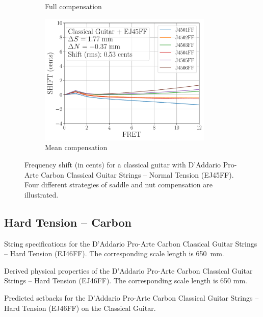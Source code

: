 \begin{figure}
\begin{subfigure}[b]{0.46\textwidth}
    \caption{Full compensation}
    \label{fig:shift_classicalguitar_ej45ff_full}
   \end{subfigure}
   \hspace{0.25in}
   \begin{subfigure}[b]{0.46\textwidth}
    \centering
    \includegraphics[width=3.25in]{../figures/shift_classicalguitar_ej45ff_mean}
    \caption{Mean compensation}
    \label{fig:shift_classicalguitar_ej45ff_mean}
   \end{subfigure}
   \caption{\label{fig:compensation_classicalguitar_ej45ff} Frequency shift (in cents) for a classical guitar with D'Addario Pro-Arte Carbon Classical Guitar Strings -- Normal Tension (EJ45FF). Four different strategies of saddle and nut compensation are illustrated.}
 \end{figure}
 
 \newpage
 \subsection{Hard Tension -- Carbon}
 
 \begin{table}[htbp]
   \centering
   \caption{\label{tbl:ej46ff_mks} String specifications for the D'Addario Pro-Arte Carbon Classical Guitar Strings -- Hard Tension (EJ46FF). The corresponding scale length is 650~mm.}
   
 \end{table}%
 
 \begin{table}[htbp]
   \centering
   \caption{\label{tbl:ej46ff_props} Derived physical properties of the D'Addario Pro-Arte Carbon Classical Guitar Strings -- Hard Tension (EJ46FF). The corresponding scale length is 650 mm.}
   
 \end{table}%
 
 \begin{table}[htbp]
   \centering
   \caption{\label{tbl:ej46ff_setbacks} Predicted setbacks for the D'Addario Pro-Arte Carbon Classical Guitar Strings -- Hard Tension (EJ46FF) on the Classical Guitar.}
   
 \end{table}%
 
